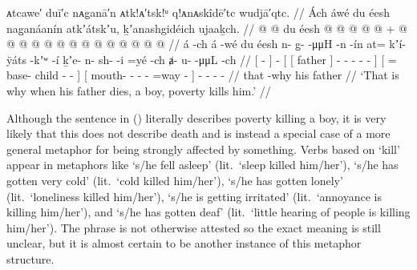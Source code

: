 \ex\label{ex:89-107-boy-killed-by-poverty}%
%
\begingl
	\glpreamble	ᴀtcawe′ duī′c nᴀg̣anā′n ᴀtk!ᴀ′tsk!ᵘ q!ᴀnᴀskîdē′tc wudjā′qtc. //
	\glpreamble	Ách áwé du éesh nag̱anáanín atkʼátskʼu, ḵʼanashgidéich ujaaḵch. //
	\gla	{}  @ {} {}  @ {}
		{} {} du éesh {} 
			 @ {} @ {} @ {} @ {} @ {} {} +
		{}  @ {} @ {} @ {} @ {} {}
		{}  @ {} @ {} @ {} @ {} @ {} @ {} {}
		 @ {} @ {} @ {} @ {} //
	\glb	{} á -ch {} á -wé
		{} {} du éesh {}
			n- g̱-  -μμH -n -ín {}
		{} at= kʼí- ÿáts -kʼʷ -í {}
		{} ḵʼe- n- sh-  -i =yé -ch {}
		ⱥ- u-  -μμL -ch //
	\glc	{}[  - {}]  -
		{}[ {}[  father {}]
			- -  - - - {}]
		{}[ = base- child - - {}]
		{}[ mouth- - -  - =way - {}]
		- -  - - //
	\gld	{} that -why {}  {}
		{} {} his father {}
			 {} {} {} {} {} {}
		{}  {} {} {} {} {}
		{}  {} {} {} {} {} {} {}
		 {} {} {} {} //
	\glft	‘That is why when his father dies, a boy, poverty kills him.’
		//
\endgl
\xe

Although the sentence in (\lastx) literally describes poverty killing a boy, it is very likely that this does not describe death and is instead a special case of a more general metaphor for being strongly affected by something.
Verbs based on  ‘kill’ appear in metaphors like  ‘s/he fell asleep’ (lit.\ ‘sleep killed him/her’),  ‘s/he has gotten very cold’ (lit.\ ‘cold killed him/her’),  ‘s/he has gotten lonely’ (lit.\ ‘loneliness killed him/her’),  ‘s/he is getting irritated’ (lit.\ ‘annoyance is killing him/her’), and  ‘s/he has gotten deaf’ (lit.\ ‘little hearing of people is killing him/her’).
The phrase  is not otherwise attested so the exact meaning is still unclear, but it is almost certain to be another instance of this metaphor structure.

